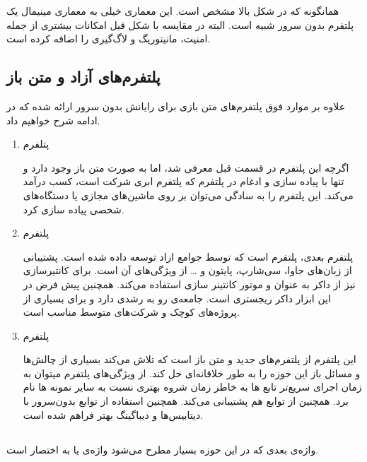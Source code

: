 همانگونه که در شکل بالا مشخص است. این معماری خیلی به معماری مینیمال یک پلتفرم بدون سرور شبیه است. البته در مقایسه با شکل قبل امکانات بیشتری از جمله امنیت، مانیتوریگ و لاگ‌گیری را اضافه کرده است. 

\subsection{پلتفرم‌های آزاد و متن باز}
علاوه بر موارد فوق پلتفرم‌های متن بازی برای رایانش بدون سرور ارائه شده که در ادامه شرح خواهیم داد. 

\begin{enumerate}
	
	\item پتلفرم 
	
	اگرچه این پلتفرم در قسمت قبل معرفی شد، اما به صورت متن باز وجود دارد و تنها  با پیاده سازی و ادغام در پلتفرم  که پلتفرم ابری شرکت  است، کسب درآمد می‌کند.  این پلتفرم را به سادگی می‌توان بر روی ماشین‌های مجازی یا دستگاه‌های شخصی پیاده سازی کرد. 
	
	\item پلتفرم  
	
	پلتفرم بعدی، پلتفرم  است که توسط جوامع ازاد توسعه داده شده است. پشتیبانی از زبان‌های جاوا، سی‌شارپ، پایتون و … از ویژگی‌های آن است. برای کانتیرسازی نیز از داکر به عنوان  و موتور کانتینر سازی استفاده می‌کند. همچنین  پیش فرض در این ابزار داکر ریجستری است. جامعه‌ی رو به رشدی دارد و برای بسیاری از پروژه‌های کوچک و شرکت‌های متوسط مناسب است.
	
	\item پلتفرم ‌
	
	این پلتفرم از پلتفرم‌های جدید و متن باز است که تلاش می‌کند بسیاری از چالش‌ها و مسائل باز این حوزه را به طور خلاقانه‌ای حل کند. از ویژگی‌های پلتفرم  میتوان به زمان اجرای سریع‌تر تابع ها به خاطر زمان شروه بهتری نسبت به سایر نمونه ها نام برد. همچنین از توابع  هم پشتیبانی می‌کند. همچنین استفاده از توابع بدون‌سرور با دیتابیس‌ها و دیباگینگ بهتر فراهم شده است. \cite{hendrickson2016serverless}
	
\end{enumerate}

\subsection{}

واژه‌ی بعدی که در این حوزه بسیار مطرح می‌شود واژه‌ی  یا به اختصار  است. 

